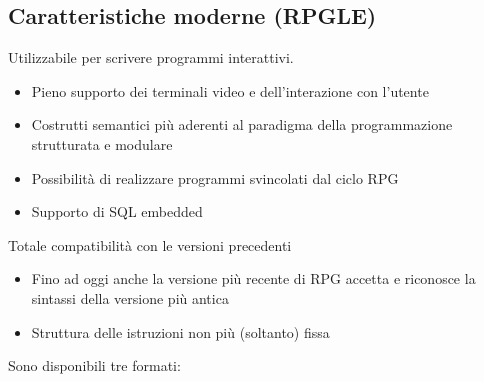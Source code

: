 \documentclass[target=bach,aauheader=,style=]{thud}
\begin{document}
\subsection{Caratteristiche moderne (RPGLE)}
Utilizzabile per scrivere programmi interattivi.
\begin{itemize}
    \setlength{\itemsep}{0pt} %
    \item Pieno supporto dei terminali video e dell’interazione con l’utente
    \item Costrutti semantici più aderenti al paradigma della programmazione strutturata e modulare
    \item Possibilità di realizzare programmi svincolati dal ciclo RPG
    \item Supporto di SQL embedded
\end{itemize}
Totale compatibilità con le versioni precedenti
\begin{itemize}
    \setlength{\itemsep}{0pt} %
    \item Fino ad oggi anche la versione più recente di RPG accetta e riconosce la sintassi della versione più antica
    \item Struttura delle istruzioni non più (soltanto) fissa
\end{itemize}  
Sono disponibili tre formati:
\end{document}
